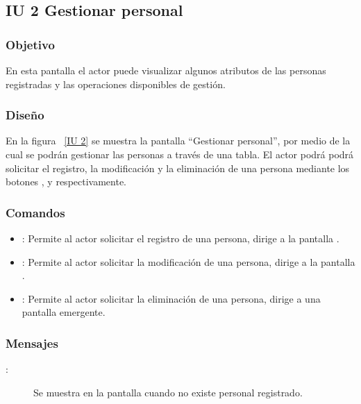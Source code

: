 \newpage 
\subsection{IU 2 Gestionar personal}
\subsubsection{Objetivo}
	
	En esta pantalla el actor puede visualizar algunos atributos de las personas registradas y las operaciones disponibles de gestión.

\subsubsection{Diseño}

    En la figura ~\ref{IU 2} se muestra la pantalla ``Gestionar personal'', por medio de la cual 
    se podrán gestionar las personas a través de una tabla. El actor podrá podrá solicitar el registro, la modificación y la eliminación 
    de una persona mediante los botones
    , \btnEditar y \btnEliminar respectivamente. \\



\subsubsection{Comandos}
\begin{itemize}
	\item {}: Permite al actor solicitar el registro de una persona, dirige a la pantalla .
	\item \btnEditar[Modificar]: Permite al actor solicitar la modificación de una persona, dirige a la pantalla .
	\item \btnEliminar[Eliminar]: Permite al actor solicitar la eliminación de una persona, dirige a una pantalla emergente.
\end{itemize}
\subsubsection{Mensajes}
	
\begin{description}
	\item[:] Se muestra en la pantalla  cuando no existe personal registrado.
\end{description}
